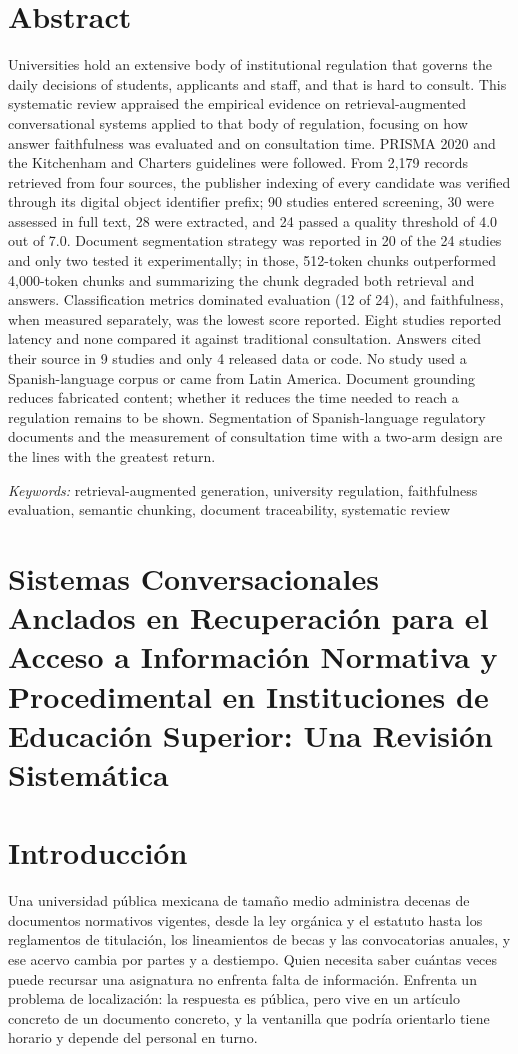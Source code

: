 \documentclass[man,12pt,floatsintext,donotrepeattitle]{apa7}
\begin{document}
\section*{Abstract}
\noindent Universities hold an extensive body of institutional regulation that governs the daily decisions of students, applicants and staff, and that is hard to consult. This systematic review appraised the empirical evidence on retrieval-augmented conversational systems applied to that body of regulation, focusing on how answer faithfulness was evaluated and on consultation time. PRISMA 2020 and the Kitchenham and Charters guidelines were followed. From 2,179 records retrieved from four sources, the publisher indexing of every candidate was verified through its digital object identifier prefix; 90 studies entered screening, 30 were assessed in full text, 28 were extracted, and 24 passed a quality threshold of 4.0 out of 7.0. Document segmentation strategy was reported in 20 of the 24 studies and only two tested it experimentally; in those, 512-token chunks outperformed 4,000-token chunks and summarizing the chunk degraded both retrieval and answers. Classification metrics dominated evaluation (12 of 24), and faithfulness, when measured separately, was the lowest score reported. Eight studies reported latency and none compared it against traditional consultation. Answers cited their source in 9 studies and only 4 released data or code. No study used a Spanish-language corpus or came from Latin America. Document grounding reduces fabricated content; whether it reduces the time needed to reach a regulation remains to be shown. Segmentation of Spanish-language regulatory documents and the measurement of consultation time with a two-arm design are the lines with the greatest return.
\par\indent\textit{Keywords:} retrieval-augmented generation, university regulation, faithfulness evaluation, semantic chunking, document traceability, systematic review

\section*{\normalfont\textbf{Sistemas Conversacionales Anclados en Recuperación para el Acceso a Información Normativa y Procedimental en Instituciones de Educación Superior: Una Revisión Sistemática}}
\section{Introducción}
Una universidad pública mexicana de tamaño medio administra decenas de documentos normativos vigentes, desde la ley orgánica y el estatuto hasta los reglamentos de titulación, los lineamientos de becas y las convocatorias anuales, y ese acervo cambia por partes y a destiempo. Quien necesita saber cuántas veces puede recursar una asignatura no enfrenta falta de información. Enfrenta un problema de localización: la respuesta es pública, pero vive en un artículo concreto de un documento concreto, y la ventanilla que podría orientarlo tiene horario y depende del personal en turno.
\end{document}
